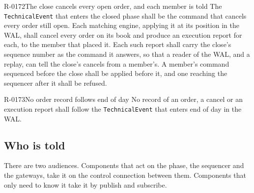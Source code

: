 \begin{requirement}{R-0172}{The close cancels every open order, and each member is told}
  The \texttt{TechnicalEvent} that enters the closed phase shall be the command that cancels every
  order still open. Each matching engine, applying it at its position in the WAL, shall cancel
  every order on its book and produce an execution report for each, to the member that placed
  it. Each such report shall carry the close's sequence number as the command it answers, so that
  a reader of the WAL, and a replay, can tell the close's cancels from a member's. A member's
  command sequenced before the close shall be applied before it, and one reaching the sequencer
  after it shall be refused.
\end{requirement}

\begin{requirement}{R-0173}{No order record follows end of day}
  No record of an order, a cancel or an execution report shall follow the \texttt{TechnicalEvent}
  that enters end of day in the WAL.
\end{requirement}

\subsection{Who is told}
\label{sec:ha:technical_event:told}

There are two audiences. Components that act on the phase, the sequencer and the gateways, take it
on the control connection between them. Components that only need to know it take it by publish and
subscribe.

